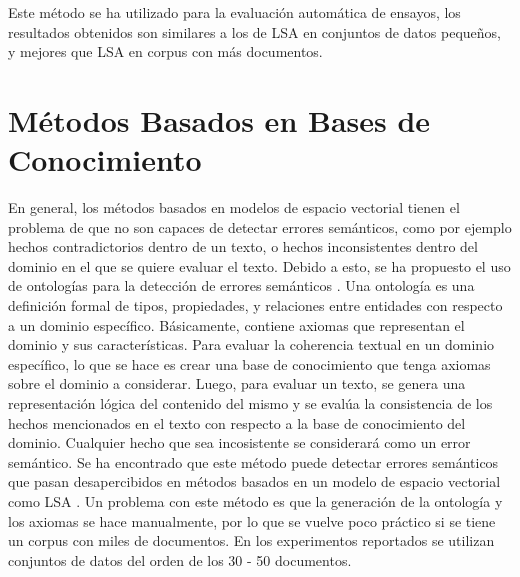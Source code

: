 \documentclass[12pt]{diicc}
\begin{document}
Este método se ha utilizado para la evaluación automática de ensayos, los resultados obtenidos son similares a los de LSA en conjuntos de datos pequeños, y mejores que LSA en corpus con más documentos.

\section{Métodos Basados en Bases de Conocimiento}
En general, los métodos basados en modelos de espacio vectorial tienen el problema de que no son capaces de detectar errores semánticos, como por ejemplo hechos contradictorios dentro de un texto, o hechos inconsistentes dentro del dominio en el que se quiere evaluar el texto. Debido a esto, se ha propuesto el uso de ontologías para la detección de errores semánticos \cite{t43}. Una ontología es una definición formal de tipos, propiedades, y relaciones entre entidades con respecto a un dominio específico. Básicamente, contiene axiomas que representan el dominio y sus características. Para evaluar la coherencia textual en un dominio específico, lo que se hace es crear una base de conocimiento que tenga axiomas sobre el dominio a considerar. Luego, para evaluar un texto, se genera una representación lógica del contenido del mismo y se evalúa la consistencia de los hechos mencionados en el texto con respecto a la base de conocimiento del dominio. Cualquier hecho que sea incosistente se considerará como un error semántico. Se ha encontrado que este método puede detectar errores semánticos que pasan desapercibidos en métodos basados en un modelo de espacio vectorial como LSA \cite{t44}. Un problema con este método es que la generación de la ontología y los axiomas se hace manualmente, por lo que se vuelve poco práctico si se tiene un corpus con miles de documentos. En los experimentos reportados se utilizan conjuntos de datos del orden de los 30 - 50 documentos.
\end{document}
